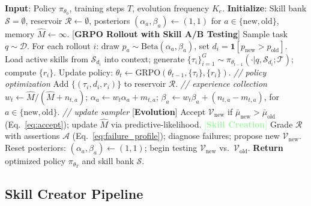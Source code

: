 \documentclass{article}
\theoremstyle{plain}
\theoremstyle{definition}
\theoremstyle{remark}
\begin{document}
\begin{algorithm}[t]
\begin{footnotesize}
\caption{\ours: RL-Guided Skill-Policy Co-Evolution}
\label{alg:scrl}
\begin{algorithmic}[1]
    \STATE \textbf{Input}: Policy $\pi_{\theta_0}$, training steps $T$, evolution frequency $K_e$.
    \STATE \textbf{Initialize}: Skill bank $\mathcal{S} {=} \emptyset$, reservoir $\mathcal{R} {\leftarrow} \emptyset$, posteriors $(\alpha_a, \beta_a) {\leftarrow} (1,1)$ for $a {\in} \{\text{new}, \text{old}\}$, memory $\hat{M} {\leftarrow} \infty$.
        \STATE \textcolor{paleblue}{[\textbf{GRPO Rollout with Skill A/B Testing}]}
        \STATE Sample task $q \sim \mathcal{D}$. For each rollout $i$: draw $p_a \sim \text{Beta}(\alpha_a, \beta_a)$, set $d_i {=} \mathbf{1}[p_{\text{new}} {>} p_{\text{old}}]$.
        \STATE Load active skills from $\mathcal{S}_{d_i}$ into context; generate $\{\tau_i\}_{i=1}^G \sim \pi_{\theta_{t-1}}(\cdot | q, \mathcal{S}_{d_i}; \mathcal{T})$; compute $\{r_i\}$.
        \STATE Update policy: $\theta_t \leftarrow \text{GRPO}(\theta_{t-1}, \{\tau_i\}, \{r_i\})$. \hfill {\color{gray}\textit{// policy optimization}}
        \STATE Add $\{(\tau_i, d_i, r_i)\}$ to reservoir $\mathcal{R}$. \hfill {\color{gray}\textit{// experience collection}}
        \STATE $w_t {\leftarrow} \hat{M}/(\hat{M}{+}n_{t,a})$;\; $\alpha_a {\leftarrow} w_t \alpha_a {+} m_{t,a}$;\; $\beta_a {\leftarrow} w_t \beta_a {+} (n_{t,a} {-} m_{t,a})$,\; for $a {\in} \{\text{new}, \text{old}\}$. \hfill {\color{gray}\textit{// update sampler}}
            \STATE \textcolor{palered}{[\textbf{Evolution}]} Accept $\mathcal{V}_{\text{new}}$ if $\bar{\mu}_{\text{new}} {>} \bar{\mu}_{\text{old}}$ (Eq.~\ref{eq:accept}); update $\hat{M}$ via predictive-likelihood.
            \STATE \textcolor{palegreen}{[\textbf{Skill Creation}]} Grade $\mathcal{R}$ with assertions $\mathcal{A}$ (Eq.~\ref{eq:failure_profile}); diagnose failures; propose new $\mathcal{V}_{\text{new}}$.
            \STATE Reset posteriors: $(\alpha_a, \beta_a) \leftarrow (1, 1)$; begin testing $\mathcal{V}_{\text{new}}$ vs.\ $\mathcal{V}_{\text{old}}$.
        \ENDIF
    \ENDFOR
    \STATE \textbf{Return} optimized policy $\pi_{\theta_T}$ and skill bank $\mathcal{S}$.
\end{algorithmic}
\end{footnotesize}
\end{algorithm}

\subsection{Skill Creator Pipeline}
\label{sec:skill_creator}
\end{document}
